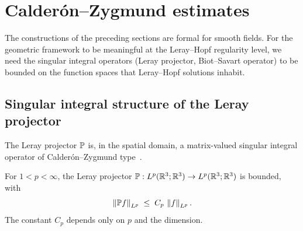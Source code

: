 \section{Calder\'{o}n--Zygmund estimates}\label{sec:bs-cz}

The constructions of the preceding sections are formal for smooth fields.  For the
geometric framework to be meaningful at the Leray--Hopf regularity level, we need
the singular integral operators (Leray projector, Biot--Savart operator) to be bounded
on the function spaces that Leray--Hopf solutions inhabit.

\subsection{Singular integral structure of the Leray projector}

The Leray projector $\mathbb{P}$ is, in the spatial domain, a matrix-valued singular integral
operator of Calder\'{o}n--Zygmund type~\cite{calderonZygmund1952,stein1970}.

\begin{theorem}\label{thm:leray-Lp}
  For $1 < p < \infty$, the Leray projector $\mathbb{P} : L^{p}(\mathbb{R}^3;\mathbb{R}^3) \to
  L^{p}(\mathbb{R}^3;\mathbb{R}^3)$ is bounded, with
  \begin{equation}\label{eq:leray-Lp-bound}
    \left\lVert \mathbb{P} f \right\rVert_{L^{p}} \;\leq\; C_p\,\left\lVert f \right\rVert_{L^{p}}.
  \end{equation}
  The constant $C_p$ depends only on $p$ and the dimension.
\end{theorem}

